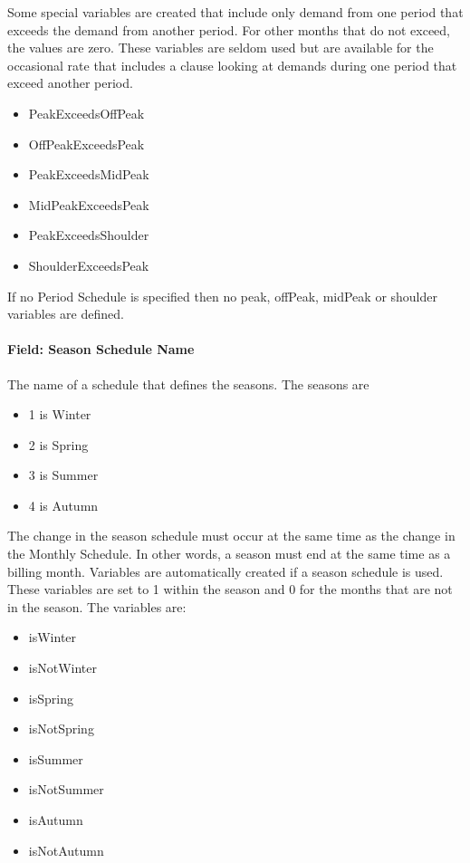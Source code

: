 Some special variables are created that include only demand from one period that exceeds the demand from another period. For other months that do not exceed, the values are zero. These variables are seldom used but are available for the occasional rate that includes a clause looking at demands during one period that exceed another period.

\begin{itemize}
\item
  PeakExceedsOffPeak
\item
  OffPeakExceedsPeak
\item
  PeakExceedsMidPeak
\item
  MidPeakExceedsPeak
\item
  PeakExceedsShoulder
\item
  ShoulderExceedsPeak
\end{itemize}

If no Period Schedule is specified then no peak, offPeak, midPeak or shoulder variables are defined.

\paragraph{Field: Season Schedule Name}\label{field-season-schedule-name}

The name of a schedule that defines the seasons. The seasons are

\begin{itemize}
\item
  1 is Winter
\item
  2 is Spring
\item
  3 is Summer
\item
  4 is Autumn
\end{itemize}

The change in the season schedule must occur at the same time as the change in the Monthly Schedule. In other words, a season must end at the same time as a billing month. Variables are automatically created if a season schedule is used. These variables are set to 1 within the season and 0 for the months that are not in the season. The variables are:

\begin{itemize}
\item
  isWinter
\item
  isNotWinter
\item
  isSpring
\item
  isNotSpring
\item
  isSummer
\item
  isNotSummer
\item
  isAutumn
\item
  isNotAutumn
\end{itemize}

